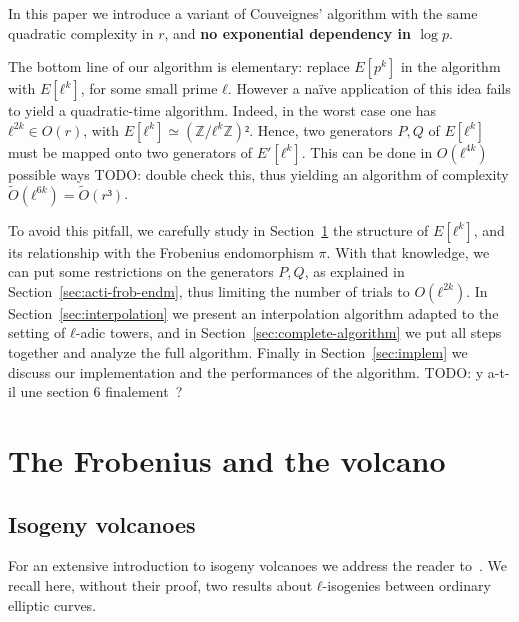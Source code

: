 \documentclass{lms}
\newcommand{\todo}[1]{{\color{red}TODO: #1}}
\newcommand{\tildO}{\tilde{O}}
\begin{document}
In this paper we
introduce a variant of Couveignes' algorithm with the same quadratic
complexity in $r$, and \textbf{no exponential dependency in $\log p$}.

The bottom line of our algorithm is elementary: replace $E[p^k]$ in
the algorithm with $E[ℓ^k]$, for some small prime $ℓ$. However a
naïve application of this idea fails to yield a quadratic-time
algorithm. Indeed, in the worst case one has $ℓ^{2k}∈O(r)$, with
$E[ℓ^k]≃(ℤ/ℓ^kℤ)²$. Hence, two generators $P,Q$ of $E[ℓ^k]$ must
be mapped onto two generators of $E'[ℓ^k]$. This can be done in
$O(ℓ^{4k})$ possible ways \todo{double check this}, thus yielding an
algorithm of complexity $\tildO(ℓ^{6k})=\tildO(r³)$.

To avoid this pitfall, we carefully study
in Section~\ref{sec:isogeny-volcanoes} the structure of
$E[ℓ^k]$, and its relationship with the Frobenius endomorphism $π$.
With that knowledge, we can put some restrictions on the generators $P,Q$,
as explained in Section~\ref{sec:acti-frob-endm},
thus limiting the number of trials to $O(ℓ^{2k})$.
In Section~\ref{sec:interpolation}
we present an interpolation algorithm adapted to the setting of
$ℓ$-adic towers, and in Section~\ref{sec:complete-algorithm} we put
all steps together and analyze the full algorithm. Finally in
Section~\ref{sec:implem} we discuss our implementation and the
performances of the algorithm.
\todo{y a-t-il une section 6 finalement ?}



\section{The Frobenius and the volcano}
\label{sec:isogeny-volcanoes}
\subsection{Isogeny volcanoes}

For an extensive introduction to isogeny volcanoes we address the
reader to~\cite{sutherland2013isogeny}.  We recall here, without their
proof, two results about $ℓ$-isogenies between ordinary elliptic
curves.
\end{document}
